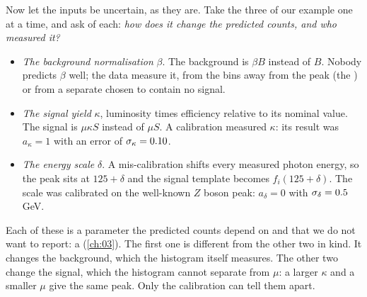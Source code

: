 Now let the inputs be uncertain, as they are. Take the three of our example one at a
time, and ask of each: \emph{how does it change the predicted counts, and who
measured it?}
\begin{itemize}[itemsep=1pt,leftmargin=1.2em]
  \item \emph{The background normalisation} $\beta$. The background is $\beta B$
        instead of $B$. Nobody predicts $\beta$ well; the data measure it, from the
        bins away from the peak (the ) or from a separate
         chosen to contain no signal.
  \item \emph{The signal yield} $\kappa$, luminosity times efficiency relative to its
        nominal value. The signal is $\mu\kappa S$ instead of $\mu S$. A calibration
        measured $\kappa$: its result was $a_\kappa=1$ with an error of
        $\sigma_\kappa=0.10$.
  \item \emph{The energy scale} $\delta$. A mis-calibration shifts every measured
        photon energy, so the peak sits at $125+\delta$ and the signal template
        becomes $f_i(125+\delta)$. The scale was calibrated on the well-known $Z$
        boson peak: $a_\delta=0$ with $\sigma_\delta=0.5\,$GeV.
\end{itemize}
Each of these is a parameter the predicted counts depend on and that we do not want
to report: a  (\cref{ch:03}). The first one is
different from the other two in kind. It changes the background, which the
histogram itself measures. The other two change the signal, which the histogram
cannot separate from $\mu$: a larger $\kappa$ and a smaller $\mu$ give the same peak.
Only the calibration can tell them apart.

